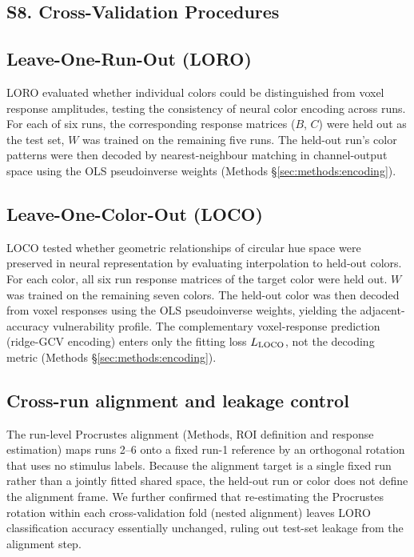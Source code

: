 
\subsection*{\textbf{S8. Cross-Validation Procedures}}

\subsection*{\textbf{Leave-One-Run-Out (LORO)}}

LORO evaluated whether individual colors could be distinguished from voxel response amplitudes, testing the consistency of neural color encoding across runs.
For each of six runs, the corresponding response matrices ($B$, $C$) were held out as the test set, $W$ was trained on the remaining five runs.
The held-out run's color patterns were then decoded by nearest-neighbour matching in channel-output space using the OLS pseudoinverse weights (Methods \S\ref{sec:methods:encoding}).

\subsection*{\textbf{Leave-One-Color-Out (LOCO)}}

LOCO tested whether geometric relationships of circular hue space were preserved in neural representation by evaluating interpolation to held-out colors.
For each color, all six run response matrices of the target color were held out. $W$ was trained on the remaining seven colors. The held-out color was then decoded from voxel responses using the OLS pseudoinverse weights, yielding the adjacent-accuracy vulnerability profile. The complementary voxel-response prediction (ridge-GCV encoding) enters only the fitting loss $L_{\rm LOCO}$, not the decoding metric (Methods \S\ref{sec:methods:encoding}).

\subsection*{\textbf{Cross-run alignment and leakage control}}

The run-level Procrustes alignment (Methods, ROI definition and response estimation) maps runs 2--6 onto a fixed run-1 reference by an orthogonal rotation that uses no stimulus labels. Because the alignment target is a single fixed run rather than a jointly fitted shared space, the held-out run or color does not define the alignment frame. We further confirmed that re-estimating the Procrustes rotation within each cross-validation fold (nested alignment) leaves LORO classification accuracy essentially unchanged, ruling out test-set leakage from the alignment step.

